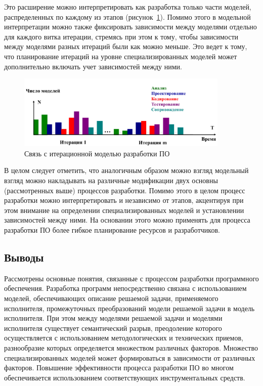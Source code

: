 Это расширение можно интерпретировать как разработка только части моделей, распределенных по каждому из этапов (рисунок~\ref{fdiag09}). Помимо этого в модельной интерпретации можно также фиксировать зависимости между моделями отдельно для каждого витка итерации, стремясь при этом к тому, чтобы зависимости между моделями разных итераций были как можно меньше. Это ведет к тому, что планирование итераций на уровне специализированных моделей может дополнительно включать учет зависимостей между ними.

\begin{figure}[htbp]
    \centering
    \includegraphics[width=0.9\textwidth]{img/fdiag09.png}
    \caption{Связь с итерационной моделью разработки ПО}
    \label{fdiag09}
\end{figure}

В целом следует отметить, что аналогичным образом можно взгляд модельный взгляд можно накладывать на различные модификации двух основны (рассмотренных выше) процессов разработки. Помимо этого в целом процесс разработки можно интерпретировать и независимо от этапов, акцентируя при этом внимание на определении специализированных моделей и установлении зависимостей между ними. На основании этого можно применять для процесса разработки ПО более гибкое планирование ресурсов и разработчиков.

\subsection{Выводы}

Рассмотрены основные понятия, связанные с процессом разработки программного обеспечения. Разработка программ непосредственно связана с использованием моделей, обеспечивающих описание решаемой задачи, применяемого исполнителя, промежуточных преобразований модели решаемой задачи в модель исполнителя. При этом между моделями решаемой задачи и моделями исполнителя существует семантический разрыв, преодоление которого осуществляется с использованием методологических и технических приемов, разнообразие которых определяется множеством различных факторов. Множество специализированных моделей может формироваться в зависимости от различных факторов. Повышение эффективности процесса разработки ПО во многом обеспечивается использованием соответствующих инструментальных средств.

